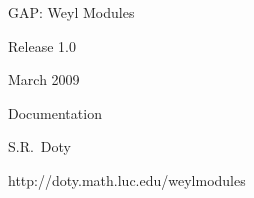   \centerline{\titlefont GAP: Weyl Modules}\bigskip
  \centerline{\secfont Release 1.0}\medskip
  \centerline{ March 2009}\bigskip\bigskip
  \centerline{\titlefont Documentation}\vfill

  \centerline{\secfont S.R.~Doty}\bigskip
  \centerline{\secfont http://doty.math.luc.edu/weylmodules}

